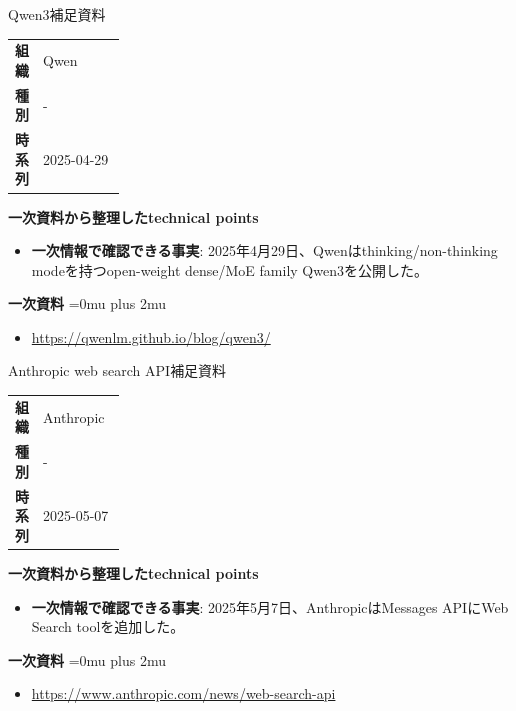 \begin{technicalnote}{Qwen3}{補足資料}
\begingroup
\begin{tabularx}{\linewidth}{@{}>{\bfseries}p{0.22\linewidth}X@{}}
組織 & Qwen \\
種別 & - \\
時系列 & 2025-04-29 \\
\end{tabularx}
\smallskip
{\bfseries 一次資料から整理したtechnical points}
\begin{itemize}[leftmargin=1.5em,itemsep=0.35em]
\item \textbf{一次情報で確認できる事実}: 2025年4月29日、Qwenはthinking/non-thinking modeを持つopen-weight dense/MoE family Qwen3を公開した。
\end{itemize}
\begin{samepage}
{\bfseries 一次資料}
\begingroup\sloppy
\Urlmuskip=0mu plus 2mu\relax
\begin{itemize}[leftmargin=1.5em,itemsep=0.25em]
\item {\scriptsize\url{https://qwenlm.github.io/blog/qwen3/}}
\end{itemize}
\endgroup
\end{samepage}
\endgroup
\end{technicalnote}
\medskip

\begin{technicalnote}{Anthropic web search API}{補足資料}
\begingroup
\begin{tabularx}{\linewidth}{@{}>{\bfseries}p{0.22\linewidth}X@{}}
組織 & Anthropic \\
種別 & - \\
時系列 & 2025-05-07 \\
\end{tabularx}
\smallskip
{\bfseries 一次資料から整理したtechnical points}
\begin{itemize}[leftmargin=1.5em,itemsep=0.35em]
\item \textbf{一次情報で確認できる事実}: 2025年5月7日、AnthropicはMessages APIにWeb Search toolを追加した。
\end{itemize}
\begin{samepage}
{\bfseries 一次資料}
\begingroup\sloppy
\Urlmuskip=0mu plus 2mu\relax
\begin{itemize}[leftmargin=1.5em,itemsep=0.25em]
\item {\scriptsize\url{https://www.anthropic.com/news/web-search-api}}
\end{itemize}
\endgroup
\end{samepage}
\endgroup
\end{technicalnote}
\medskip

